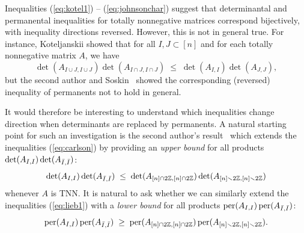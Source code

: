 \documentclass[12pt]{amsart}
\theoremstyle{definition}
\numberwithin{equation}{section}
\DeclareMathOperator{\perm}{per}
\newcommand{\ssm}{\smallsetminus}
\begin{document}
Inequalities (\ref{eq:kotel1}) -- (\ref{eq:johnsonchar}) suggest that
determinantal and permanental inequalities for totally nonnegative matrices
correspond bijectively,
with inequality directions reversed.
However, this is not in general true.
For instance,
Koteljanskii \cite{KotelProp}
showed that for all $I,J \subset [n]$ and
for each totally nonnegative matrix $A$, we have
\begin{equation}\label{eq:kotel2}
  \det(A_{I\cup J, I\cup J})\det(A_{I\cap J, I\cap J}) \;\leq\;
  \det(A_{I,I}) \det(A_{J,J}),
\end{equation}
but the second author and Soskin~\cite[\S 6]{SkanSoskinBJArx}
showed the corresponding (reversed) inequality of permanents
not to hold in general.

It would therefore be interesting to understand which inequalities
change direction when determinants are replaced by permanents.
A natural starting point for such an investigation
is the second author's result~\cite[Thm.\,3.2]{SkanIneq}
which extends
the inequalities (\ref{eq:carlson}) by providing an {\em upper bound}
for all products $\det(A_{I,I}) \det(A_{\Bar I, \Bar I})$:
  \begin{equation*}
    \det(A_{I,I}) \det(A_{\Bar I,\Bar I}) \;\leq\;
    \det(A_{[n] \cap 2\mathbb Z, [n] \cap 2\mathbb Z})
    \det(A_{[n] \ssm 2\mathbb Z, [n] \ssm 2\mathbb Z})
  \end{equation*}
  whenever $A$ is TNN.
  It is natural to ask whether we can similarly extend the
  inequalities (\ref{eq:lieb1}) with a {\em lower bound} for all
  products $\perm(A_{I,I}) \perm(A_{\Bar I, \Bar I})$:
\begin{equation}\label{eq:evenoddintro}
    \perm(A_{I,I}) \perm(A_{\Bar I, \Bar I}) \;\geq\;
    \perm(A_{[n] \cap 2\mathbb Z, [n] \cap 2\mathbb Z})
    \perm(A_{[n] \ssm 2\mathbb Z, [n] \ssm 2\mathbb Z}).
  \end{equation}
\end{document}

